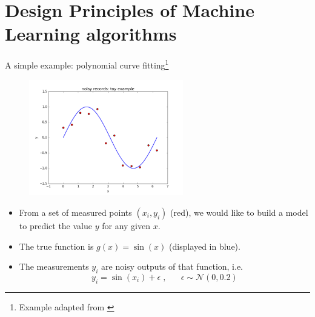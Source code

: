 \documentclass[xcolor=pdftex,dvipsnames,table]{beamer}
\begin{document}
\section{Design Principles of Machine Learning algorithms}

\begin{frame}{A simple example: polynomial curve fitting\footnote{Example adapted from \cite{Bishop2006}}}
\begin{figure}[htb]
\includegraphics[width=0.6\textwidth]{../graphics/sample_from_sin.png}
\end{figure}
\begin{itemize}
	\item From a set of measured points $(x_i, y_i)$ (red), we would like to build a model to predict the value $y$ for any given $x$.
	\item The true function is $g(x)=\sin (x)$ (displayed in blue).
	\item The measurements $y_i$ are noisy outputs of that function, i.e.
	\begin{equation}
	y_i = \sin (x_i) + \epsilon \; , \;\;\; \;\;\; \epsilon \sim \mathcal{N}(0,0.2)
	\end{equation}
\end{itemize}
\end{frame}
\end{document}

